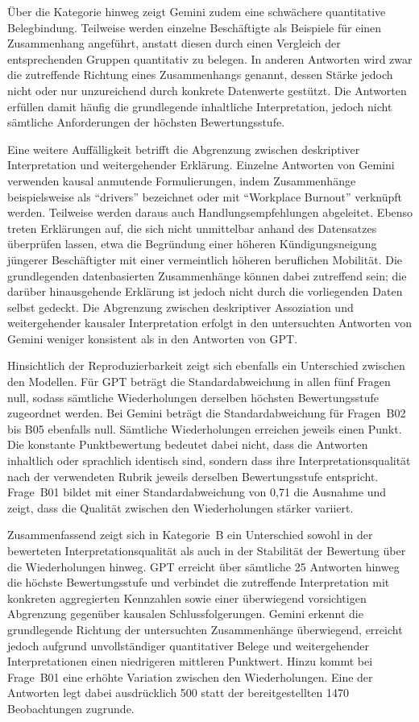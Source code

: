 Über die Kategorie hinweg zeigt Gemini zudem eine schwächere quantitative Belegbindung. Teilweise werden einzelne Beschäftigte als Beispiele für einen Zusammenhang angeführt, anstatt diesen durch einen Vergleich der entsprechenden Gruppen quantitativ zu belegen. In anderen Antworten wird zwar die zutreffende Richtung eines Zusammenhangs genannt, dessen Stärke jedoch nicht oder nur unzureichend durch konkrete Datenwerte gestützt. Die Antworten erfüllen damit häufig die grundlegende inhaltliche Interpretation, jedoch nicht sämtliche Anforderungen der höchsten Bewertungsstufe.

Eine weitere Auffälligkeit betrifft die Abgrenzung zwischen deskriptiver Interpretation und weitergehender Erklärung. Einzelne Antworten von Gemini verwenden kausal anmutende Formulierungen, indem Zusammenhänge beispielsweise als ``drivers'' bezeichnet oder mit ``Workplace Burnout'' verknüpft werden. Teilweise werden daraus auch Handlungsempfehlungen abgeleitet. Ebenso treten Erklärungen auf, die sich nicht unmittelbar anhand des Datensatzes überprüfen lassen, etwa die Begründung einer höheren Kündigungsneigung jüngerer Beschäftigter mit einer vermeintlich höheren beruflichen Mobilität. Die grundlegenden datenbasierten Zusammenhänge können dabei zutreffend sein; die darüber hinausgehende Erklärung ist jedoch nicht durch die vorliegenden Daten selbst gedeckt. Die Abgrenzung zwischen deskriptiver Assoziation und weitergehender kausaler Interpretation erfolgt in den untersuchten Antworten von Gemini weniger konsistent als in den Antworten von GPT.

Hinsichtlich der Reproduzierbarkeit zeigt sich ebenfalls ein Unterschied zwischen den Modellen. Für GPT beträgt die Standardabweichung in allen fünf Fragen null, sodass sämtliche Wiederholungen derselben höchsten Bewertungsstufe zugeordnet werden. Bei Gemini beträgt die Standardabweichung für Fragen~B02 bis B05 ebenfalls null. Sämtliche Wiederholungen erreichen jeweils einen Punkt. Die konstante Punktbewertung bedeutet dabei nicht, dass die Antworten inhaltlich oder sprachlich identisch sind, sondern dass ihre Interpretationsqualität nach der verwendeten Rubrik jeweils derselben Bewertungsstufe entspricht. Frage~B01 bildet mit einer Standardabweichung von 0,71 die Ausnahme und zeigt, dass die Qualität zwischen den Wiederholungen stärker variiert.

Zusammenfassend zeigt sich in Kategorie~B ein Unterschied sowohl in der bewerteten Interpretationsqualität als auch in der Stabilität der Bewertung über die Wiederholungen hinweg. GPT erreicht über sämtliche 25 Antworten hinweg die höchste Bewertungsstufe und verbindet die zutreffende Interpretation mit konkreten aggregierten Kennzahlen sowie einer überwiegend vorsichtigen Abgrenzung gegenüber kausalen Schlussfolgerungen. Gemini erkennt die grundlegende Richtung der untersuchten Zusammenhänge überwiegend, erreicht jedoch aufgrund unvollständiger quantitativer Belege und weitergehender Interpretationen einen niedrigeren mittleren Punktwert. Hinzu kommt bei Frage~B01 eine erhöhte Variation zwischen den Wiederholungen. Eine der Antworten legt dabei ausdrücklich 500 statt der bereitgestellten 1470 Beobachtungen zugrunde.

